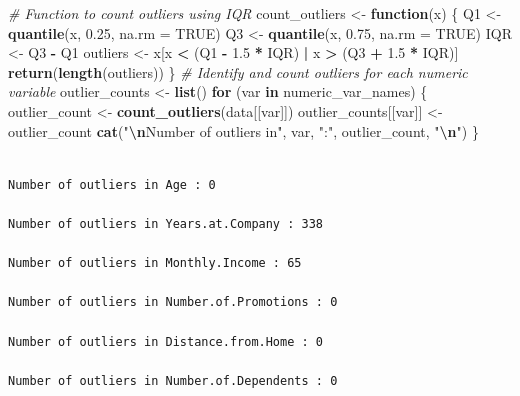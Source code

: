 \documentclass[
  10pt,
  paper=a4,
  ,captions=tableheading
]{scrartcl}
\newenvironment{Shaded}{\begin{snugshade}}{\end{snugshade}}
\newcommand{\AttributeTok}[1]{\textcolor[rgb]{0.13,0.29,0.53}{#1}}
\newcommand{\CommentTok}[1]{\textcolor[rgb]{0.56,0.35,0.01}{\textit{#1}}}
\newcommand{\ConstantTok}[1]{\textcolor[rgb]{0.56,0.35,0.01}{#1}}
\newcommand{\ControlFlowTok}[1]{\textcolor[rgb]{0.13,0.29,0.53}{\textbf{#1}}}
\newcommand{\FloatTok}[1]{\textcolor[rgb]{0.00,0.00,0.81}{#1}}
\newcommand{\FunctionTok}[1]{\textcolor[rgb]{0.13,0.29,0.53}{\textbf{#1}}}
\newcommand{\NormalTok}[1]{#1}
\newcommand{\OtherTok}[1]{\textcolor[rgb]{0.56,0.35,0.01}{#1}}
\newcommand{\SpecialCharTok}[1]{\textcolor[rgb]{0.81,0.36,0.00}{\textbf{#1}}}
\newcommand{\StringTok}[1]{\textcolor[rgb]{0.31,0.60,0.02}{#1}}
\begin{document}
\small

\small

\begin{Shaded}
\begin{Highlighting}[]
\CommentTok{\# Function to count outliers using IQR}
\NormalTok{count\_outliers }\OtherTok{\textless{}{-}} \ControlFlowTok{function}\NormalTok{(x) \{}
\NormalTok{    Q1 }\OtherTok{\textless{}{-}} \FunctionTok{quantile}\NormalTok{(x, }\FloatTok{0.25}\NormalTok{, }\AttributeTok{na.rm =} \ConstantTok{TRUE}\NormalTok{)}
\NormalTok{    Q3 }\OtherTok{\textless{}{-}} \FunctionTok{quantile}\NormalTok{(x, }\FloatTok{0.75}\NormalTok{, }\AttributeTok{na.rm =} \ConstantTok{TRUE}\NormalTok{)}
\NormalTok{    IQR }\OtherTok{\textless{}{-}}\NormalTok{ Q3 }\SpecialCharTok{{-}}\NormalTok{ Q1}
\NormalTok{    outliers }\OtherTok{\textless{}{-}}\NormalTok{ x[x }\SpecialCharTok{\textless{}}\NormalTok{ (Q1 }\SpecialCharTok{{-}} \FloatTok{1.5} \SpecialCharTok{*}\NormalTok{ IQR) }\SpecialCharTok{|}\NormalTok{ x }\SpecialCharTok{\textgreater{}}\NormalTok{ (Q3 }\SpecialCharTok{+} \FloatTok{1.5} \SpecialCharTok{*}\NormalTok{ IQR)]}
    \FunctionTok{return}\NormalTok{(}\FunctionTok{length}\NormalTok{(outliers))}
\NormalTok{\}}
\CommentTok{\# Identify and count outliers for each numeric variable}
\NormalTok{outlier\_counts }\OtherTok{\textless{}{-}} \FunctionTok{list}\NormalTok{()}
\ControlFlowTok{for}\NormalTok{ (var }\ControlFlowTok{in}\NormalTok{ numeric\_var\_names) \{}
\NormalTok{    outlier\_count }\OtherTok{\textless{}{-}} \FunctionTok{count\_outliers}\NormalTok{(data[[var]])}
\NormalTok{    outlier\_counts[[var]] }\OtherTok{\textless{}{-}}\NormalTok{ outlier\_count}
    \FunctionTok{cat}\NormalTok{(}\StringTok{"}\SpecialCharTok{\textbackslash{}n}\StringTok{Number of outliers in"}\NormalTok{, var, }\StringTok{":"}\NormalTok{, outlier\_count, }\StringTok{"}\SpecialCharTok{\textbackslash{}n}\StringTok{"}\NormalTok{)}
\NormalTok{\}}
\end{Highlighting}
\end{Shaded}

\begin{verbatim}

Number of outliers in Age : 0 

Number of outliers in Years.at.Company : 338 

Number of outliers in Monthly.Income : 65 

Number of outliers in Number.of.Promotions : 0 

Number of outliers in Distance.from.Home : 0 

Number of outliers in Number.of.Dependents : 0 
\end{verbatim}
\end{document}
